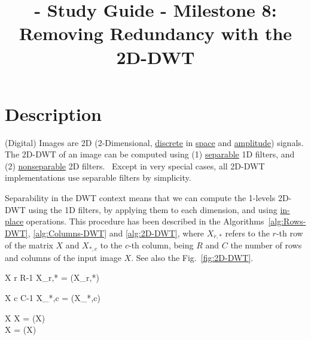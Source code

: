 
\title{\SM{} - Study Guide - Milestone 8: Removing Redundancy with the 2D-DWT}

\maketitle

\section{Description}

(Digital) Images are 2D (2-Dimensional,
\href{https://en.wikipedia.org/wiki/Discrete_time_and_continuous_time}{discrete}
in \href{https://en.wikipedia.org/wiki/Space}{space} and
\href{https://en.wikipedia.org/wiki/Amplitude}{amplitude})
signals. The 2D-DWT of an image can be computed using (1)
\href{https://en.wikipedia.org/wiki/Separable_filter}{separable} 1D
filters, and (2)
\href{https://en.wikipedia.org/wiki/Non-separable_wavelet}{nonseparable}
2D filters.~\cite{sayood2017introduction} Except in very special
cases, all 2D-DWT implementations use separable filters by simplicity.

Separability in the DWT context means that we can compute the 1-levels
2D-DWT using the 1D filters, by applying them to each dimension, and
using
\href{https://en.wikipedia.org/wiki/In-place_algorithm}{in-place}
operations. This procedure has been described in the
Algorithms~\ref{alg:Rows-DWT}, \ref{alg:Columns-DWT} and
\ref{alg:2D-DWT}, where $X_{r,*}$ refers to the $r$-th row of the
matrix $X$ and $X_{*,c}$ to the $c$-th column, being $R$ and $C$ the
number of rows and columns of the input image $X$. See also the
Fig.~\ref{fig:2D-DWT}.

\begin{pseudocode}{}{X}
  \label{alg:Rows-DWT}
  \FOR r  \TO R-1 \DO
  X_{r,*} = (X_{r,*})\\
\end{pseudocode}

\begin{pseudocode}{}{X}
  \label{alg:Columns-DWT}
  \FOR c  \TO C-1 \DO
  X_{*,c} = (X_{*,c})\\
\end{pseudocode}

\begin{pseudocode}{}{X}
  \label{alg:2D-DWT}
  X = (X)\\
  X = (X)\\
\end{pseudocode}

